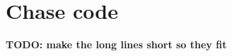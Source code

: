 \section{Chase code}
	\label{sec:appendixChase}
	\textbf{TODO: make the long lines short so they fit}
	{\scriptsize
		\lstset{
			language=Haskell,
			numbers=left,
			columns=fixed,
			tabsize=3,
		}
		
	}

